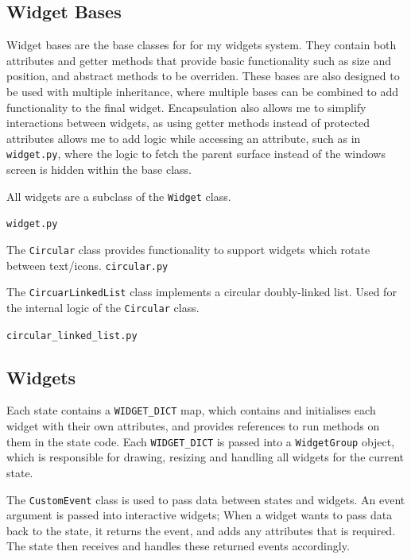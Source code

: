 \documentclass[../main/main.tex]{subfiles}
\begin{document}
\subsection{Widget Bases}
\label{sec:widget-bases}
Widget bases are the base classes for for my widgets system. They contain both attributes and getter methods that provide basic functionality such as size and position, and abstract methods to be overriden. These bases are also designed to be used with multiple inheritance, where multiple bases can be combined to add functionality to the final widget. Encapsulation also allows me to simplify interactions between widgets, as using getter methods instead of protected attributes allows me to add logic while accessing an attribute, such as in \verb|widget.py|, where the logic to fetch the parent surface instead of the windows screen is hidden within the base class.

\bigskip
\noindent All widgets are a subclass of the \lstinline{Widget} class.

\noindent\verb|widget.py|


\bigskip
\noindent The \lstinline{Circular} class provides functionality to support widgets which rotate between text/icons.
\noindent\verb|circular.py|


\bigskip
\noindent The \lstinline{CircuarLinkedList} class implements a circular doubly-linked list. Used for the internal logic of the \lstinline{Circular} class.

\noindent\verb|circular_linked_list.py|


\subsection{Widgets}
\label{sec:widgets}
Each state contains a \lstinline{WIDGET_DICT} map, which contains and initialises each widget with their own attributes, and provides references to run methods on them in the state code. Each \lstinline{WIDGET_DICT} is passed into a \lstinline{WidgetGroup} object, which is responsible for drawing, resizing and handling all widgets for the current state.

The \lstinline{CustomEvent} class is used to pass data between states and widgets. An event argument is passed into interactive widgets; When a widget wants to pass data back to the state, it returns the event, and adds any attributes that is required. The state then receives and handles these returned events accordingly.
\end{document}

